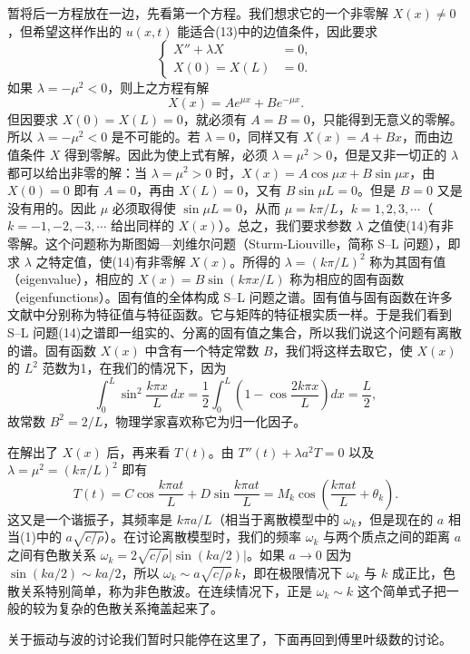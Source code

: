 暂将后一方程放在一边，先看第一个方程。我们想求它的一个非零解 $X(x)\ne0$，但希望这样作出的 $u(x,t)$ 能适合(13)中的边值条件，因此要求
\begin{equation}
 \left\{
 \begin{aligned}
 X''+\lambda X&=0,\\
 X(0)=X(L)&=0.
 \end{aligned}
 \right.
 \tag{14}
\end{equation}
如果 $\lambda=-\mu^2<0$，则上之方程有解
\[
 X(x)=Ae^{\mu x}+Be^{-\mu x}.
\]
但因要求 $X(0)=X(L)=0$，就必须有 $A=B=0$，只能得到无意义的零解。所以 $\lambda=-\mu^2<0$ 是不可能的。若 $\lambda=0$，同样又有 $X(x)=A+Bx$，而由边值条件 $X$ 得到零解。因此为使上式有解，必须 $\lambda=\mu^2>0$，但是又非一切正的 $\lambda$ 都可以给出非零的解：当 $\lambda=\mu^2>0$ 时，$X(x)=A\cos\mu x+B\sin\mu x$，由 $X(0)=0$ 即有 $A=0$，再由 $X(L)=0$，又有 $B\sin\mu L=0$。但是 $B=0$ 又是没有用的。因此 $\mu$ 必须取得使 $\sin\mu L=0$，从而 $\mu=k\pi/L$，$k=1,2,3,\cdots$（$k=-1,-2,-3,\cdots$ 给出同样的 $X(x)$）。总之，我们要求参数 $\lambda$ 之值使(14)有非零解。这个问题称为斯图姆—刘维尔问题（Sturm-Liouville，简称 S--L 问题），即求 $\lambda$ 之特定值，使(14)有非零解 $X(x)$。所得的 $\lambda=(k\pi/L)^2$ 称为其固有值（eigenvalue），相应的 $X(x)=B\sin(k\pi x/L)$ 称为相应的固有函数（eigenfunctions）。固有值的全体构成 S--L 问题之谱。固有值与固有函数在许多文献中分别称为特征值与特征函数。它与矩阵的特征根实质一样。于是我们看到 S--L 问题(14)之谱即一组实的、分离的固有值之集合，所以我们说这个问题有离散的谱。固有函数 $X(x)$ 中含有一个特定常数 $B$，我们将这样去取它，使 $X(x)$ 的 $L^2$ 范数为1，在我们的情况下，因为
\[
 \int_0^L\sin^2\frac{k\pi x}{L}\,dx
 =\frac12\int_0^L\left(1-\cos\frac{2k\pi x}{L}\right)dx=\frac L2,
\]
故常数 $B^2=2/L$，物理学家喜欢称它为归一化因子。

在解出了 $X(x)$ 后，再来看 $T(t)$。由 $T''(t)+\lambda a^2T=0$ 以及 $\lambda=\mu^2=(k\pi/L)^2$ 即有
\[
 T(t)=C\cos\frac{k\pi at}{L}+D\sin\frac{k\pi at}{L}
 =M_k\cos\left(\frac{k\pi at}{L}+\theta_k\right).
\]
这又是一个谐振子，其频率是 $k\pi a/L$（相当于离散模型中的 $\omega_k$，但是现在的 $a$ 相当(1)中的 $a\sqrt{c/\rho}$）。在讨论离散模型时，我们的频率 $\omega_k$ 与两个质点之间的距离 $a$ 之间有色散关系 $\omega_k=2\sqrt{c/\rho}|\sin(ka/2)|$。如果 $a\to0$ 因为 $\sin(ka/2)\sim ka/2$，所以 $\omega_k\sim a\sqrt{c/\rho}\,k$，即在极限情况下 $\omega_k$ 与 $k$ 成正比，色散关系特别简单，称为非色散波。在连续情况下，正是 $\omega_k\sim k$ 这个简单式子把一般的较为复杂的色散关系掩盖起来了。

关于振动与波的讨论我们暂时只能停在这里了，下面再回到傅里叶级数的讨论。

